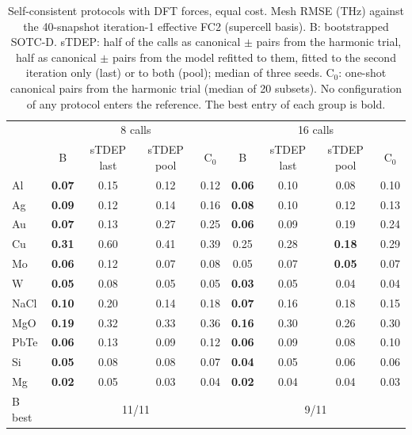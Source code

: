 \begin{table}[t]
\caption{Self-consistent protocols with DFT forces, equal cost. Mesh RMSE (THz) against the 40-snapshot iteration-1 effective FC2 (supercell basis). B: bootstrapped SOTC-D. sTDEP: half of the calls as canonical $\pm$ pairs from the harmonic trial, half as canonical $\pm$ pairs from the model refitted to them, fitted to the second iteration only (last) or to both (pool); median of three seeds. C$_0$: one-shot canonical pairs from the harmonic trial (median of 20 subsets). No configuration of any protocol enters the reference. The best entry of each group is bold.}
\label{tab:stdep}
\begin{ruledtabular}
\begin{tabular}{lcccccccc}
 & \multicolumn{4}{c}{8 calls} & \multicolumn{4}{c}{16 calls}\\
 & B & sTDEP last & sTDEP pool & C$_0$ & B & sTDEP last & sTDEP pool & C$_0$\\
\hline
Al & \textbf{0.07} & 0.15 & 0.12 & 0.12 & \textbf{0.06} & 0.10 & 0.08 & 0.10\\
Ag & \textbf{0.09} & 0.12 & 0.14 & 0.16 & \textbf{0.08} & 0.10 & 0.12 & 0.13\\
Au & \textbf{0.07} & 0.13 & 0.27 & 0.25 & \textbf{0.06} & 0.09 & 0.19 & 0.24\\
Cu & \textbf{0.31} & 0.60 & 0.41 & 0.39 & 0.25 & 0.28 & \textbf{0.18} & 0.29\\
Mo & \textbf{0.06} & 0.12 & 0.07 & 0.08 & 0.05 & 0.07 & \textbf{0.05} & 0.07\\
W & \textbf{0.05} & 0.08 & 0.05 & 0.05 & \textbf{0.03} & 0.05 & 0.04 & 0.04\\
NaCl & \textbf{0.10} & 0.20 & 0.14 & 0.18 & \textbf{0.07} & 0.16 & 0.18 & 0.15\\
MgO & \textbf{0.19} & 0.32 & 0.33 & 0.36 & \textbf{0.16} & 0.30 & 0.26 & 0.30\\
PbTe & \textbf{0.06} & 0.13 & 0.09 & 0.12 & \textbf{0.06} & 0.09 & 0.08 & 0.10\\
Si & \textbf{0.05} & 0.08 & 0.08 & 0.07 & \textbf{0.04} & 0.05 & 0.06 & 0.06\\
Mg & \textbf{0.02} & 0.05 & 0.03 & 0.04 & \textbf{0.02} & 0.04 & 0.04 & 0.03\\
\hline
B best & \multicolumn{4}{c}{11/11} & \multicolumn{4}{c}{9/11}\\
\end{tabular}
\end{ruledtabular}
\end{table}
